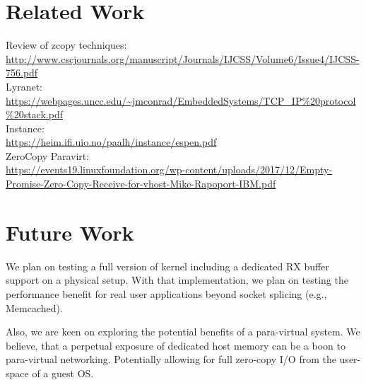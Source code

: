 \section{Related Work}
Review of zcopy techniques:\\
\url{http://www.cscjournals.org/manuscript/Journals/IJCSS/Volume6/Issue4/IJCSS-756.pdf}\\
Lyranet:\\
\url{https://webpages.uncc.edu/~jmconrad/EmbeddedSystems/TCP_IP\%20protocol\%20stack.pdf}\\
Instance:\\
\url{https://heim.ifi.uio.no/paalh/instance/espen.pdf}\\
ZeroCopy Paravirt:\\
\url{https://events19.linuxfoundation.org/wp-content/uploads/2017/12/Empty-Promise-Zero-Copy-Receive-for-vhost-Mike-Rapoport-IBM.pdf}

\section{Future Work}
We plan on testing a full version of \oursys kernel including a dedicated RX buffer support on a physical setup. With that implementation, we plan on testing the performance benefit for real user applications beyond socket splicing (e.g., Memcached).

Also, we are keen on exploring the potential benefits of \oursys a para-virtual system. We believe, that a perpetual exposure of dedicated host memory can be a boon to para-virtual networking. Potentially allowing for full zero-copy I/O from the user-space of a guest OS.
